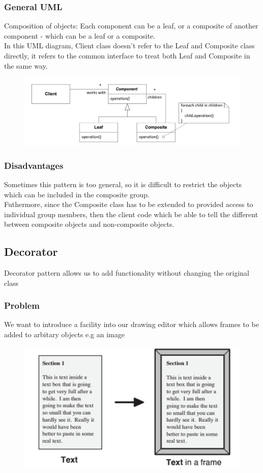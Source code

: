\documentclass{article}
\begin{document}
\subsubsection*{General UML}
Composition of objects: Each component can be a leaf, or a composite of another component - which can be a leaf or a composite. \\
In this UML diagram, Client class doesn't refer to the Leaf and Composite class directly, it refers to the common interface to treat both Leaf and Composite in the same way.
\begin{figure}[H]
    \centering
    \includegraphics[width=0.8\linewidth]{Pictures/Screenshot 2023-02-05 at 12.32.37.png}
\end{figure}
\subsubsection*{Disadvantages}
Sometimes this pattern is too general, so it is difficult to restrict the objects which can be included in the composite group. \\
Futhermore, since the Composite class has to be extended to provided access to individual group members, then the client code which be able to tell the different between composite objects and non-composite objects.
\subsection{Decorator}
Decorator pattern allows us to add functionality without changing the original class
\subsubsection*{Problem}
We want to introduce a facility into our drawing editor which allows frames to be added to arbitary objects e.g an image
\begin{figure}[H]
    \centering
    \includegraphics[width=0.5\linewidth]{Pictures/Screenshot 2023-02-05 at 12.35.44.png}
\end{figure}
\end{document}
